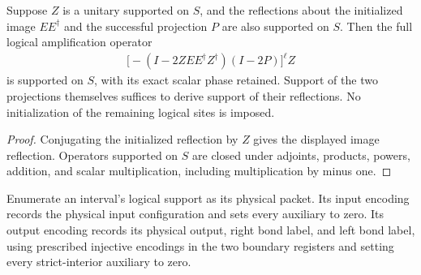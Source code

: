 \begin{lemma}
    \label{thm:mpu_amplification_support}
    \leanok
    Suppose $Z$ is a unitary supported on $S$, and the reflections
    about the initialized image $EE^\dagger$ and the successful
    projection $P$ are also supported on $S$. Then the full logical
    amplification operator
    \begin{align}
        \bigl[-(I-2ZEE^\dagger Z^\dagger)(I-2P)\bigr]^\ell Z
    \end{align}
    is supported on $S$, with its exact scalar phase retained.
    Support of the two projections themselves suffices to derive
    support of their reflections. No initialization of the remaining
    logical sites is imposed.
\end{lemma}
\begin{proof}\leanok
    Conjugating the initialized reflection by $Z$ gives the displayed
    image reflection. Operators supported on $S$ are closed under
    adjoints, products, powers, addition, and scalar multiplication,
    including multiplication by minus one.
\end{proof}

\begin{definition}
    \label{def:mpu_interval_column_encoding}
    \leanok
    Enumerate an interval's logical support as its physical packet.
    Its input encoding records the physical input configuration and
    sets every auxiliary to zero. Its output encoding records its
    physical output, right bond label, and left bond label, using
    prescribed injective encodings in the two boundary registers and
    setting every strict-interior auxiliary to zero.
\end{definition}

